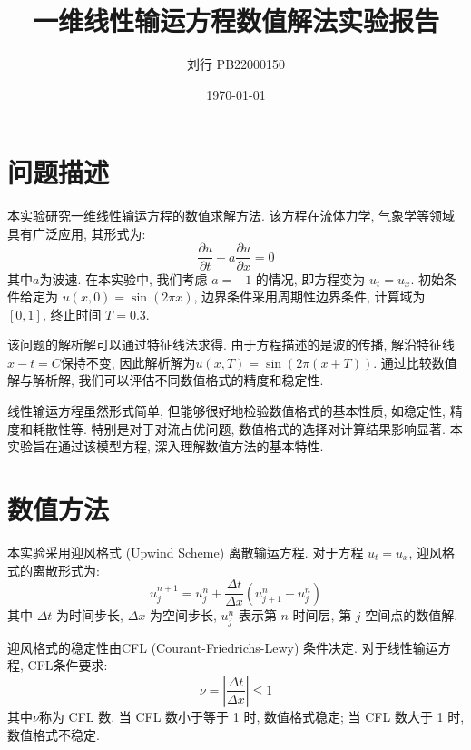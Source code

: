 \documentclass[12pt,a4paper]{article}
\title{一维线性输运方程数值解法实验报告}
\author{刘行 PB22000150}
\date{\today}
\begin{document}
    \maketitle

    \section{问题描述}
        本实验研究一维线性输运方程的数值求解方法. 该方程在流体力学, 气象学等领域具有广泛应用, 其形式为:
        \begin{equation}
            \frac{\partial u}{\partial t} + a \frac{\partial u}{\partial x} = 0
        \end{equation}
        其中$a$为波速. 在本实验中, 我们考虑 $a = -1$ 的情况, 即方程变为 $u_{t} = u_{x}$. 初始条件给定为 $u\left(x,0\right) = \sin\left(2\pi x\right)$, 边界条件采用周期性边界条件, 计算域为 $\left[0,1\right]$, 终止时间 $T = 0.3$.

        该问题的解析解可以通过特征线法求得. 由于方程描述的是波的传播, 解沿特征线$x - t = C$保持不变, 因此解析解为$u(x,T) = \sin\left(2\pi\left(x+T\right)\right)$. 通过比较数值解与解析解, 我们可以评估不同数值格式的精度和稳定性.

        线性输运方程虽然形式简单, 但能够很好地检验数值格式的基本性质, 如稳定性, 精度和耗散性等. 特别是对于对流占优问题, 数值格式的选择对计算结果影响显著. 本实验旨在通过该模型方程, 深入理解数值方法的基本特性.

    \section{数值方法}
        本实验采用迎风格式 (Upwind Scheme) 离散输运方程. 对于方程 $u_t = u_x$, 迎风格式的离散形式为:
        \begin{equation}
            u_{j}^{n+1} = u_{j}^{n} + \frac{\Delta t}{\Delta x}\left(u_{j+1}^{n} - u_{j}^{n}\right)
        \end{equation}
        其中 $\Delta t$ 为时间步长, $\Delta x$ 为空间步长, $u_{j}^{n}$ 表示第 $n$ 时间层, 第 $j$ 空间点的数值解.

        迎风格式的稳定性由CFL (Courant-Friedrichs-Lewy) 条件决定. 对于线性输运方程, CFL条件要求:
        \begin{equation}
            \nu = \left\lvert\frac{\Delta t}{\Delta x}\right\rvert \leq 1
        \end{equation}
        其中$\nu$称为 CFL 数. 当 CFL 数小于等于 1 时, 数值格式稳定; 当 CFL 数大于 1 时, 数值格式不稳定.
\end{document}
